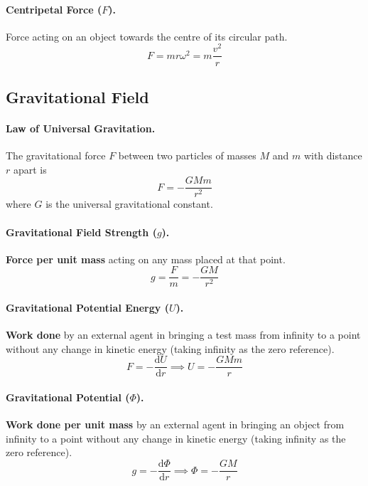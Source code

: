 \documentclass{article}
\begin{document}
\paragraph{Centripetal Force ($F$).} Force acting on an object towards the
centre of its circular path. \begin{equation} F = mr\omega^2 = m\frac{v^2}{r}
\end{equation}

\subsection{Gravitational Field}

\paragraph{Law of Universal Gravitation.} The gravitational force $F$ between
two particles of masses $M$ and $m$ with distance $r$ apart is \begin{equation}
F = -\frac{GMm}{r^2} \end{equation} where $G$ is the universal gravitational
constant.

\paragraph{Gravitational Field Strength ($g$).} \textbf{Force per unit mass}
acting on any mass placed at that point. \begin{equation} g = \frac{F}{m} =
-\frac{GM}{r^2} \end{equation}

\paragraph{Gravitational Potential Energy ($U$).} \textbf{Work done} by an
external agent in bringing a test mass from infinity to a point without any
change in kinetic energy (taking infinity as the zero reference).
\begin{equation} F = -\frac{\mathrm{d}U}{\mathrm{d}r} \implies U =
  -\frac{GMm}{r} \end{equation}

\paragraph{Gravitational Potential ($\Phi$).} \textbf{Work done per unit mass}
by an external agent in bringing an object from infinity to a point without any
change in kinetic energy (taking infinity as the zero reference).
\begin{equation} g = -\frac{\mathrm{d}\Phi}{\mathrm{d}r} \implies \Phi =
  -\frac{GM}{r} \end{equation}
\end{document}
